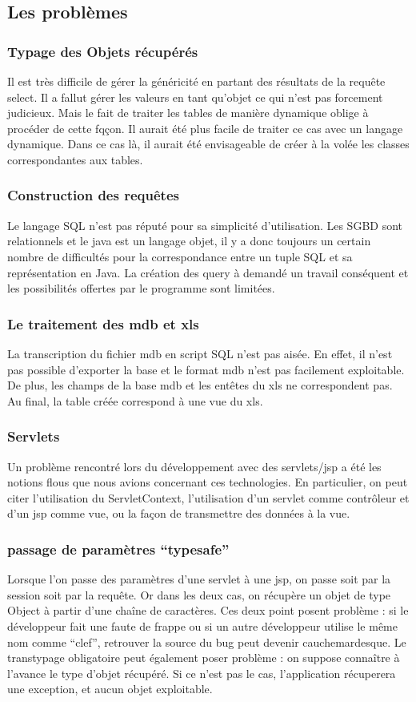 \subsection{Les problèmes}
\subsubsection{Typage des Objets récupérés}
Il est très difficile de gérer la généricité en partant des résultats de la requête select. Il a fallut gérer les valeurs en tant qu'objet ce qui n'est pas forcement judicieux. Mais le fait de traiter les tables de manière dynamique oblige à procéder de cette fqçon. Il aurait été plus facile de traiter ce cas avec un langage dynamique. Dans ce cas là, il aurait été envisageable de créer à la volée les classes correspondantes aux tables.
\subsubsection{Construction des requêtes}
Le langage SQL n'est pas réputé pour sa simplicité d'utilisation. Les SGBD sont relationnels et le java est un langage objet, il y a donc toujours un certain nombre de difficultés pour la correspondance entre un tuple SQL et sa représentation en Java. La création des query à demandé un travail conséquent et les possibilités offertes par le programme sont limitées.
\subsubsection{Le traitement des mdb et xls}
La transcription du fichier mdb en script SQL n'est pas aisée. En effet, il n'est pas possible d'exporter la base et le format mdb n'est pas facilement exploitable. De plus, les champs de la base mdb et les entêtes du xls ne correspondent pas. Au final, la table créée correspond à une vue du xls.

\subsubsection{Servlets}
Un problème rencontré lors du développement avec des servlets/jsp a été les notions flous que nous avions concernant ces technologies. En particulier, on peut citer l'utilisation du ServletContext, l'utilisation d'un servlet comme contrôleur et d'un jsp comme vue, ou la façon de transmettre des données à la vue.

\subsubsection{passage de paramètres ``typesafe''}
Lorsque l'on passe des paramètres d'une servlet à une jsp, on passe soit par la session soit par la requête. Or dans les deux cas, on récupère un objet de type Object à partir d'une chaîne de caractères. Ces deux point posent problème : si le développeur fait une faute de frappe ou si un autre développeur utilise le même nom comme ``clef'', retrouver la source du bug peut devenir cauchemardesque. Le transtypage obligatoire peut également poser problème : on suppose connaître à l'avance le type d'objet récupéré. Si ce n'est pas le cas, l'application récuperera une exception, et aucun objet exploitable.

